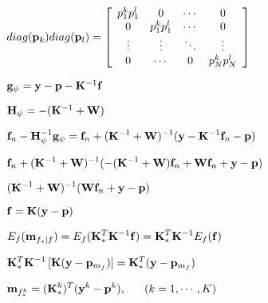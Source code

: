 \documentclass{article}
\def\lthtmlcheckvsize{\ifdim\ht\sizebox<\vsize 
  \ifdim\wd\sizebox<\hsize\expandafter\hfill\fi \expandafter\vfill
  \else\expandafter\vss\fi}%
\begin{document}
{\newpage\clearpage
{}%
$\displaystyle diag({\bf p}_k) diag({\bf p}_l)=\left[\begin{array}{cccc}
p_1^kp_1^l & 0 & \cdots & 0\\
0 & p_1^kp_1^l & \cdots & 0\\
\vdots & \vdots & \ddots & \vdots \\
0 & \cdots & 0 & p_N^kp_N^l \end{array}\right]$%
\lthtmlindisplaymathZ
\lthtmlcheckvsize\clearpage}

{\newpage\clearpage
{}%
$ {\bf g}_\psi={\bf y}-{\bf p}-{\bf K}^{-1}{\bf f}$%
\lthtmlindisplaymathZ
\lthtmlcheckvsize\clearpage}

{\newpage\clearpage
{}%
$ {\bf H}_\psi=-({\bf K}^{-1}+{\bf W})$%
\lthtmlindisplaymathZ
\lthtmlcheckvsize\clearpage}

{\newpage\clearpage
{}%
$\displaystyle {\bf f}_n-{\bf H}_\psi^{-1}{\bf g}_\psi
={\bf f}_n+({\bf K}^{-1}+{\bf W})^{-1}({\bf y}-{\bf K}^{-1}{\bf f}_n-{\bf p})$%
\lthtmlindisplaymathZ
\lthtmlcheckvsize\clearpage}

{\newpage\clearpage
{}%
$\displaystyle {\bf f}_n+({\bf K}^{-1}+{\bf W})^{-1}(-({\bf K}^{-1}+{\bf W}){\bf f}_n+{\bf W}{\bf f}_n+{\bf y}-{\bf p})$%
\lthtmlindisplaymathZ
\lthtmlcheckvsize\clearpage}

{\newpage\clearpage
{}%
$\displaystyle ({\bf K}^{-1}+{\bf W})^{-1}({\bf W}{\bf f}_n+{\bf y}-{\bf p})$%
\lthtmlindisplaymathZ
\lthtmlcheckvsize\clearpage}

{\newpage\clearpage
{}%
$ {\bf f}={\bf K}({\bf y}-{\bf p})$%
\lthtmlindisplaymathZ
\lthtmlcheckvsize\clearpage}

{\newpage\clearpage
{}%
$\displaystyle E_f({\bf m}_{f_*|f})
=E_f ({\bf K}_*^T{\bf K}^{-1}{\bf f})={\bf K}_*^T{\bf K}^{-1}E_f({\bf f})$%
\lthtmlindisplaymathZ
\lthtmlcheckvsize\clearpage}

{\newpage\clearpage
{}%
$\displaystyle {\bf K}_*^T{\bf K}^{-1}\,[{\bf K}({\bf y}-{\bf p}_{m_f})]
={\bf K}_*^T({\bf y}-{\bf p}_{m_f})$%
\lthtmlindisplaymathZ
\lthtmlcheckvsize\clearpage}

{\newpage\clearpage
{}%
$\displaystyle {\bf m}_{f_*^k}=({\bf K}_*^k)^T({\bf y}^k-{\bf p}^k),
\;\;\;\;\;\;(k=1,\cdots,K)$%
\lthtmlindisplaymathZ
\lthtmlcheckvsize\clearpage}
\end{document}
